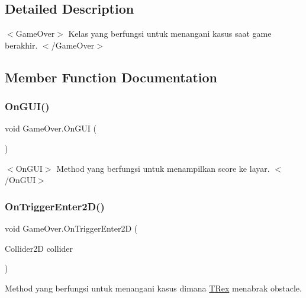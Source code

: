 \subsection{Detailed Description}
$<$\+Game\+Over$>$ Kelas yang berfungsi untuk menangani kasus saat game berakhir. $<$/\+Game\+Over$>$ 

\subsection{Member Function Documentation}
\hypertarget{class_game_over_abc4992fdbb9d7c3c8134ff24d1944171}{}\label{class_game_over_abc4992fdbb9d7c3c8134ff24d1944171} 
\subsubsection{\texorpdfstring{On\+G\+U\+I()}{OnGUI()}}
{\footnotesize\ttfamily void Game\+Over.\+On\+G\+UI (\begin{DoxyParamCaption}{ }\end{DoxyParamCaption})\hspace{0.3cm}{\ttfamily [private]}}

$<$\+On\+G\+U\+I$>$ Method yang berfungsi untuk menampilkan score ke layar. $<$/\+On\+G\+U\+I$>$ \hypertarget{class_game_over_a8da95bbe7fc4559116c077698378bbfb}{}\label{class_game_over_a8da95bbe7fc4559116c077698378bbfb} 
\subsubsection{\texorpdfstring{On\+Trigger\+Enter2\+D()}{OnTriggerEnter2D()}}
{\footnotesize\ttfamily void Game\+Over.\+On\+Trigger\+Enter2D (\begin{DoxyParamCaption}\item[{Collider2D}]{collider }\end{DoxyParamCaption})\hspace{0.3cm}{\ttfamily [private]}}



Method yang berfungsi untuk menangani kasus dimana \hyperlink{class_t_rex}{T\+Rex} menabrak obstacle. 

\hypertarget{class_game_over_a568be230765aad02fc07c3ff2d655e41}{}\label{class_game_over_a568be230765aad02fc07c3ff2d655e41} 
